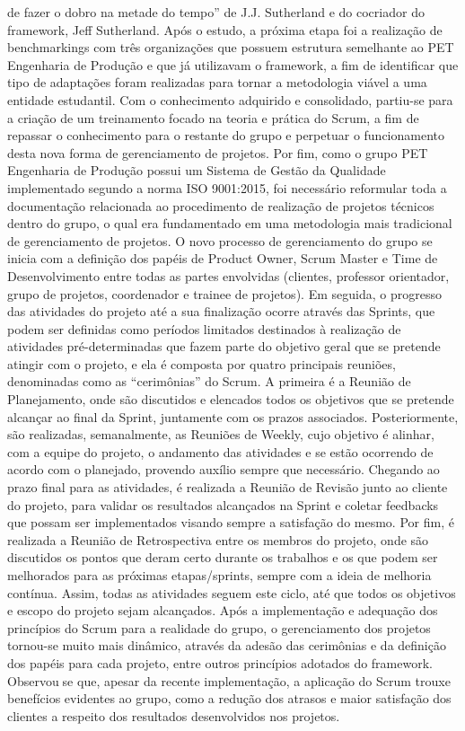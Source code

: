 de fazer o dobro na metade do tempo” de J.J. Sutherland e do cocriador do framework, Jeff 
Sutherland. Após o estudo, a próxima etapa foi a realização de benchmarkings com três 
organizações que possuem estrutura semelhante ao PET Engenharia de Produção e que já 
utilizavam o framework, a fim de identificar que tipo de adaptações foram realizadas para tornar a 
metodologia viável a uma entidade estudantil.
Com o conhecimento adquirido e consolidado, partiu-se para a criação de um treinamento 
focado na teoria e prática do Scrum, a fim de repassar o conhecimento para o restante do grupo e 
perpetuar o funcionamento desta nova forma de gerenciamento de projetos. Por fim, como o grupo 
PET Engenharia de Produção possui um Sistema de Gestão da Qualidade implementado segundo 
a norma ISO 9001:2015, foi necessário reformular toda a documentação relacionada ao 
procedimento de realização de projetos técnicos dentro do grupo, o qual era fundamentado em 
uma metodologia mais tradicional de gerenciamento de projetos.
O novo processo de gerenciamento do grupo se inicia com a definição dos papéis de
Product Owner, Scrum Master e Time de Desenvolvimento entre todas as partes envolvidas 
(clientes, professor orientador, grupo de projetos, coordenador e trainee de projetos). Em seguida, 
o progresso das atividades do projeto até a sua finalização ocorre através das Sprints, que podem 
ser definidas como períodos limitados destinados à realização de atividades pré-determinadas que 
fazem parte do objetivo geral que se pretende atingir com o projeto, e ela é composta por quatro 
principais reuniões, denominadas como as “cerimônias” do Scrum.
A primeira é a Reunião de Planejamento, onde são discutidos e elencados todos os 
objetivos que se pretende alcançar ao final da Sprint, juntamente com os prazos associados. 
Posteriormente, são realizadas, semanalmente, as Reuniões de Weekly, cujo objetivo é alinhar, 
com a equipe do projeto, o andamento das atividades e se estão ocorrendo de acordo com o 
planejado, provendo auxílio sempre que necessário. Chegando ao prazo final para as atividades, é 
realizada a Reunião de Revisão junto ao cliente do projeto, para validar os resultados alcançados 
na Sprint e coletar feedbacks que possam ser implementados visando sempre a satisfação do 
mesmo. Por fim, é realizada a Reunião de Retrospectiva entre os membros do projeto, onde são 
discutidos os pontos que deram certo durante os trabalhos e os que podem ser melhorados para as 
próximas etapas/sprints, sempre com a ideia de melhoria contínua. Assim, todas as atividades 
seguem este ciclo, até que todos os objetivos e escopo do projeto sejam alcançados.
Após a implementação e adequação dos princípios do Scrum para a realidade do grupo, o 
gerenciamento dos projetos tornou-se muito mais dinâmico, através da adesão das cerimônias e da 
definição dos papéis para cada projeto, entre outros princípios adotados do framework. Observouse que, apesar da recente implementação, a aplicação do Scrum trouxe benefícios evidentes ao 
grupo, como a redução dos atrasos e maior satisfação dos clientes a respeito dos resultados 
desenvolvidos nos projetos.

